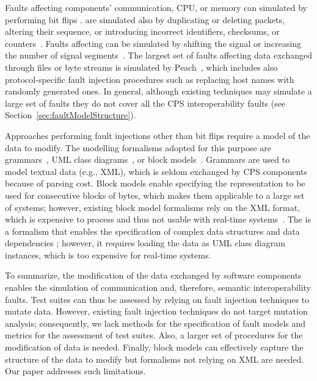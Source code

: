 Faults affecting components' communication,
CPU, or memory can simulated by performing bit flips
\cite{tsai1999stress,barton1990fault,han1995doctor,dawson1996testing}.
 are simulated also by duplicating or deleting packets, altering their sequence, or introducing incorrect identifiers, checksums, or counters~\cite{di2015evolutionary,di2015generating}.
Faults affecting  can be simulated by shifting the signal or increasing the number of signal segments~\cite{Matinnejad19}.
The largest set of faults affecting data exchanged through files or byte streams is simulated by Peach~\cite{PeachFuzzer}, which includes also protocol-specific fault injection procedures such as replacing host names with randomly generated ones.
In general, although existing techniques may simulate a large set of faults they do not cover all the CPS interoperability faults (see Section~\ref{sec:faultModelStructure}).

Approaches performing fault injections other than bit flips require a model of the data to modify.
The modelling formalisms adopted for this purpose are grammars~\cite{ghosh1998testing,Godefroid:GrammarBasedFuzzying:2008,godefroid2012sage,bounimova2013billions}, UML class diagrams~\cite{di2015evolutionary,di2015generating}, or block models~\cite{pham2016model,PeachFuzzer}.
Grammars are used to model textual data (e.g., XML), which is seldom exchanged by CPS components because of parsing cost.
Block models enable specifying the representation to be used for consecutive blocks of bytes, which makes them applicable to a large set of systems; however, existing block model formalisms rely on the XML format, which is expensive to process and thus not usable with real-time systems~\cite{pham2016model,PeachFuzzer}.
The  is a formalism that
enables the specification of complex data structures and
data dependencies
\cite{di2015evolutionary,di2015generating}; however, it requires loading the data as UML class diagram instances, which is too expensive for real-time systems.

To summarize, the modification of the data exchanged by software components enables the simulation of communication and, therefore, semantic interoperability faults.
Test suites can thus be assessed by relying on fault injection techniques to mutate data.
However, existing fault injection techniques do not target mutation analysis; consequently, we lack methods for the specification of fault models and metrics for the assessment of test suites.
Also, a larger set of procedures for the modification of data is needed.
Finally, block models can effectively capture the structure of the data to modify but formalisms not relying on XML are needed. Our paper addresses such limitations.

